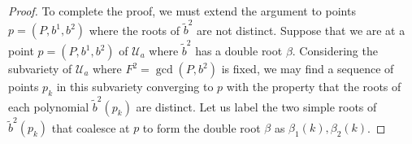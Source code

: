 \documentclass{article}
\begin{document}
\begin{lem}
\begin{proof}
To complete the proof, we must extend the argument to points $p = (P,b^1,b^2)$ where the roots of $\tilde{b}^2$ are not distinct.
Suppose that we are at a point $p = (P,b^1,b^2)$ of $\mathcal{U}_{a}$ where $\tilde{b}^2$ has a double root $\beta$. Considering the subvariety of $\mathcal{U}_{a}$ where $F^2 = \gcd(P,b^2)$ is fixed, we may find a sequence of points $p_k$ in this subvariety converging to $p$ with the property that the roots of each polynomial $\tilde{b}^2(p_k)$ are distinct. Let us label the two simple roots of $\tilde{b}^2(p_k)$ that coalesce at $p$ to form the double root $\beta$ as $\beta_1(k),\beta_2(k)$.


\end{proof}
\end{lem}
\end{document}
